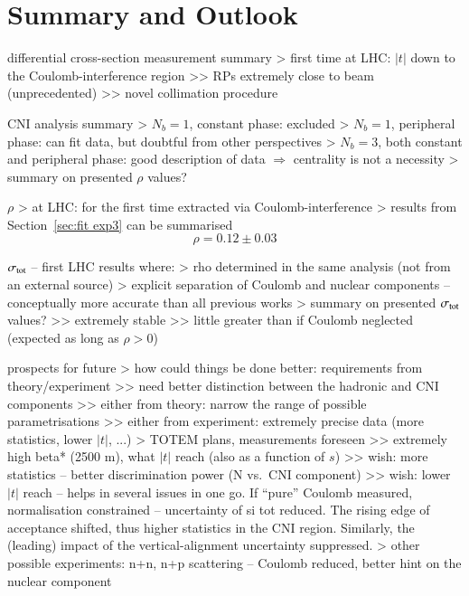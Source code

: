 \section{Summary and Outlook}

\> differential cross-section measurement summary
\>> first time at LHC: $|t|$ down to the Coulomb-interference region
\>>> RPs extremely close to beam (unprecedented)
\>>> novel collimation procedure


\> CNI analysis summary
\>> $N_b=1$, constant phase: excluded
\>> $N_b=1$, peripheral phase: can fit data, but doubtful from other perspectives
\>> $N_b=3$, both constant and peripheral phase: good description of data $\Rightarrow$ centrality is not a necessity
\>> summary on presented $\rho$ values?

\> $\rho$
\>> at LHC: for the first time extracted via Coulomb-interference
\>> results from Section~\ref{sec:fit exp3} can be summarised
\begin{equation}
\label{eq:rho final}
\rho = 0.12 \pm 0.03
\end{equation}

\> $\sigma_{\rm tot}$ -- first LHC results where:
\>> rho determined in the same analysis (not from an external source)
\>> explicit separation of Coulomb and nuclear components -- conceptually more accurate than all previous works
\>> summary on presented $\sigma_{\rm tot}$ values?
\>>> extremely stable
\>>> little greater than if Coulomb neglected (expected as long as $\rho > 0$)

\> prospects for future
\>> how could things be done better: requirements from theory/experiment
\>>> need better distinction between the hadronic and CNI components
\>>> either from theory: narrow the range of possible parametrisations
\>>> either from experiment: extremely precise data (more statistics, lower $|t|$, ...)
\>> TOTEM plans, measurements foreseen
\>>> extremely high beta* (2500 m), what $|t|$ reach (also as a function of $s$)
\>>> wish: more statistics -- better discrimination power (N vs.~CNI component)
\>>> wish: lower $|t|$ reach -- helps in several issues in one go. If ``pure'' Coulomb measured, normalisation constrained -- uncertainty of si tot reduced. The rising edge of acceptance shifted, thus higher statistics in the CNI region. Similarly, the (leading) impact of the vertical-alignment uncertainty suppressed.
\>> other possible experiments: n+n, n+p scattering -- Coulomb reduced, better hint on the nuclear component
